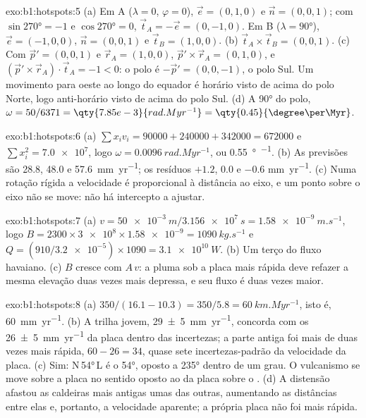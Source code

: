 \begin{solution}{exo:b1:hotspots:5}
(a) Em A ($\lambda = 0$, $\varphi = 0$), $\vec e = (0, 1, 0)$ e
$\vec n = (0, 0, 1)$; com $\sin\ang{270} = -1$ e $\cos\ang{270} = 0$, $\vec t_A = -\vec e = (0, -1, 0)$. Em B ($\lambda = \ang{90}$), $\vec e = (-1, 0, 0)$, $\vec n = (0, 0, 1)$ e $\vec t_B = (1, 0, 0)$. (b) $\vec t_A\times\vec t_B = (0, 0, 1)$. (c) Com $\vec p' = (0, 0, 1)$ e $\vec r_A = (1, 0, 0)$, $\vec p'\times\vec r_A = (0, 1, 0)$, e $(\vec p'\times\vec r_A)\cdot\vec t_A = -1 < 0$: o polo é $-\vec p' = (0, 0, -1)$, o polo Sul. Um movimento para oeste ao longo do equador é horário visto de acima do polo Norte, logo anti-horário visto de acima do polo Sul. (d) A \ang{90} do polo, $\omega = 50/6371 =
\qty{7.85e-3}{rad.Myr^{-1}} = \qty{0.45}{\degree\per\Myr}$.
\end{solution}

\begin{solution}{exo:b1:hotspots:6}
(a) $\sum x_i v_i = 90000 + 240000 + 342000 = \num{672000}$ e $\sum x_i^2 = \num{7.0e7}$, logo $\omega = \qty{0.0096}{rad.Myr^{-1}}$, ou \qty{0.55}{\degree\per\Myr}. (b) As previsões são 28.8, 48.0 e \qty{57.6}{mm.yr^{-1}}; os resíduos $+1.2$, $0.0$ e $-0.6$
\unit{mm.yr^{-1}}. (c) Numa rotação rígida a velocidade é proporcional à distância ao eixo, e um ponto sobre o eixo não se move: não há intercepto a ajustar.
\end{solution}

\begin{solution}{exo:b1:hotspots:7}
(a) $v = \qty{50e-3}{m}/\qty{3.156e7}{s} = \qty{1.58e-9}{m.s^{-1}}$, logo
$B = 2300\times\num{3e8}\times\num{1.58e-9} = \qty{1090}{kg.s^{-1}}$ e $Q = (910/\num{3.2e-5})\times1090 = \qty{3.1e10}{W}$. (b) Um terço do fluxo havaiano. (c) $B$ cresce com $A\,v$: a pluma sob a placa mais rápida deve refazer a mesma elevação duas vezes mais depressa, e seu fluxo é duas vezes maior.
\end{solution}

\begin{solution}{exo:b1:hotspots:8}
(a) $350/(16.1 - 10.3) = 350/5.8 = \qty{60}{km.Myr^{-1}}$, isto é, \qty{60}{mm.yr^{-1}}. (b) A trilha jovem, \qty{29 \pm 5}{mm.yr^{-1}}, concorda com os \qty{26 \pm 5}{mm.yr^{-1}} da placa dentro das incertezas; a parte antiga foi mais de duas vezes mais rápida, $60 - 26 = 34$, quase sete incertezas-padrão da velocidade da placa. (c) Sim: N\,\ang{54}\,L é o  \ang{54}, oposto a \ang{235} dentro de um grau. O vulcanismo se move sobre a placa no sentido oposto ao da placa sobre o . (d) A distensão afastou as caldeiras mais antigas umas das outras, aumentando as distâncias entre elas e, portanto, a velocidade aparente; a própria placa não foi mais rápida.
\end{solution}

